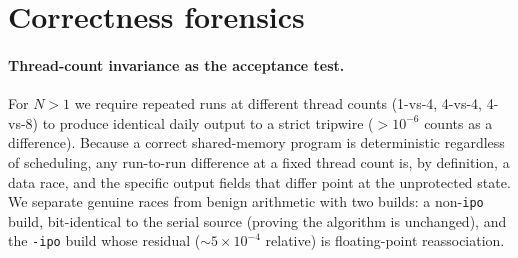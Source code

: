 \documentclass[12pt]{article}
\begin{document}
\section{Correctness forensics}\label{si:forensics}
\paragraph{Thread-count invariance as the acceptance test.} For $N>1$ we require repeated runs at
different thread counts (1-vs-4, 4-vs-4, 4-vs-8) to produce identical daily output to a strict
tripwire ($>10^{-6}$ counts as a difference). Because a correct shared-memory program is
deterministic regardless of scheduling, any run-to-run difference at a fixed thread count is, by
definition, a data race, and the specific output fields that differ point at the unprotected state.
We separate genuine races from benign arithmetic with two builds: a non-\texttt{ipo} build,
bit-identical to the serial source (proving the algorithm is unchanged), and the \texttt{-ipo}
build whose residual ($\sim$$5\times10^{-4}$ relative) is floating-point reassociation.
\end{document}
